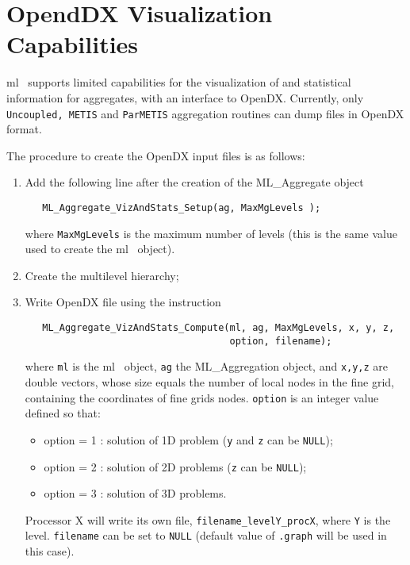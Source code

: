 \documentclass[10pt,letter,relax]{SANDreport}
\newcommand{\ML}     {{\sc ml }}
\begin{document}

\section{OpendDX Visualization Capabilities}
\label{sec:viz}

\ML\ supports limited capabilities for the visualization of and statistical
information for aggregates, with an interface to OpenDX.
Currently, only {\tt Uncoupled,
METIS} and {\tt ParMETIS} aggregation routines can dump files in OpenDX
format.

The procedure to create the OpenDX input files is as follows:
\begin{enumerate}
\item Add the following line after the creation of the ML\_Aggregate object
\begin{verbatim}
   ML_Aggregate_VizAndStats_Setup(ag, MaxMgLevels );
\end{verbatim}
  where \verb!MaxMgLevels! is the maximum number of levels (this is the
  same value used to create the \ML\ object).
\item Create the multilevel hierarchy;
\item Write OpenDX file using the instruction
\begin{verbatim}
   ML_Aggregate_VizAndStats_Compute(ml, ag, MaxMgLevels, x, y, z,
                                    option, filename);
\end{verbatim}
   where \verb!ml! is the \ML\ object, \verb!ag! the ML\_Aggregation object, 
   and \verb!x,y,z! are double vectors, whose size
   equals the number of local nodes in the fine grid, containing the coordinates
   of fine grids nodes. \verb!option! is an integer value defined so
   that:
   \begin{itemize}
   \item option = 1 : solution of 1D problem ({\tt y} and {\tt z} can be
     {\tt NULL});
   \item option = 2 : solution of 2D problems ({\tt z} can be {\tt NULL});
   \item option = 3 : solution of 3D problems.
   \end{itemize}
   Processor X will write its own file, \verb!filename_levelY_procX!, where
   \verb!Y! is the level. \verb!filename! can be set to {\tt NULL} (default value of
   \verb!.graph! will be used in this case).
   

\end{enumerate}
\end{document}
